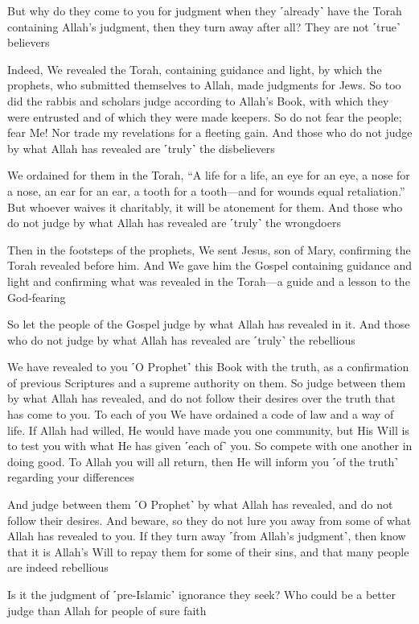 But why do they come to you for judgment when they ˹already˺ have the Torah containing Allah’s judgment, then they turn away after all? They are not ˹true˺ believers

Indeed, We revealed the Torah, containing guidance and light, by which the prophets, who submitted themselves to Allah, made judgments for Jews. So too did the rabbis and scholars judge according to Allah’s Book, with which they were entrusted and of which they were made keepers. So do not fear the people; fear Me! Nor trade my revelations for a fleeting gain. And those who do not judge by what Allah has revealed are ˹truly˺ the disbelievers

We ordained for them in the Torah, “A life for a life, an eye for an eye, a nose for a nose, an ear for an ear, a tooth for a tooth—and for wounds equal retaliation.” But whoever waives it charitably, it will be atonement for them. And those who do not judge by what Allah has revealed are ˹truly˺ the wrongdoers

Then in the footsteps of the prophets, We sent Jesus, son of Mary, confirming the Torah revealed before him. And We gave him the Gospel containing guidance and light and confirming what was revealed in the Torah—a guide and a lesson to the God-fearing

So let the people of the Gospel judge by what Allah has revealed in it. And those who do not judge by what Allah has revealed are ˹truly˺ the rebellious

We have revealed to you ˹O Prophet˺ this Book with the truth, as a confirmation of previous Scriptures and a supreme authority on them. So judge between them by what Allah has revealed, and do not follow their desires over the truth that has come to you. To each of you We have ordained a code of law and a way of life. If Allah had willed, He would have made you one community, but His Will is to test you with what He has given ˹each of˺ you. So compete with one another in doing good. To Allah you will all return, then He will inform you ˹of the truth˺ regarding your differences

And judge between them ˹O Prophet˺ by what Allah has revealed, and do not follow their desires. And beware, so they do not lure you away from some of what Allah has revealed to you. If they turn away ˹from Allah’s judgment˺, then know that it is Allah’s Will to repay them for some of their sins, and that many people are indeed rebellious

Is it the judgment of ˹pre-Islamic˺ ignorance they seek? Who could be a better judge than Allah for people of sure faith

